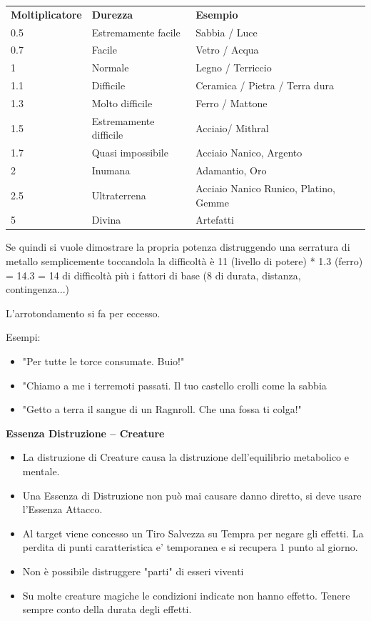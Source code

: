 \documentclass[a4paper,10 pt,twoside,openany]{book}
\begin{document}
\medskip
\begin{tabular}{lll}
	\toprule
	\textbf{Moltiplicatore} & \textbf{Durezza}       & \textbf{Esempio}\\
	0.5                   & Estremamente facile    & Sabbia / Luce \\
	0.7                   & Facile                 & Vetro / Acqua\\
	1                     & Normale                & Legno / Terriccio\\
	1.1                   & Difficile              & Ceramica / Pietra / Terra dura\\
	1.3                   & Molto difficile        & Ferro / Mattone\\
	1.5                   & Estremamente difficile & Acciaio/ Mithral\\
	1.7                   & Quasi impossibile      & Acciaio Nanico, Argento\\
	2                     & Inumana                & Adamantio, Oro\\
	2.5                   & Ultraterrena           & Acciaio Nanico Runico, Platino, Gemme\\
	5                     & Divina                 & Artefatti \\

\end{tabular}

\bigskip

Se quindi si vuole dimostrare la propria potenza distruggendo una serratura di metallo semplicemente toccandola la difficoltà è 11 (livello di potere) {*} 1.3 (ferro) = 14.3 = 14 di difficoltà più i fattori di base (8 di durata, distanza, contingenza...)

L'arrotondamento si fa per eccesso.

Esempi:
\begin{itemize}
	\item
	"Per tutte le torce consumate. Buio!"
	\item
	"Chiamo a me i terremoti passati. Il tuo castello crolli come la sabbia
	\item
	"Getto a terra il sangue di un Ragnroll. Che una fossa ti colga!"
\end{itemize}


\textbf{Essenza Distruzione -- Creature}
\begin{itemize}
	\item
	La distruzione di Creature causa la distruzione dell'equilibrio metabolico e mentale.
	\item
	Una Essenza di Distruzione non può mai causare danno diretto, si deve usare l'Essenza Attacco.
	\item
	Al target viene concesso un Tiro Salvezza su Tempra per negare gli effetti. La perdita di punti caratteristica e' temporanea e si recupera 1 punto al giorno.
	\item
	Non è possibile distruggere "parti" di esseri viventi
	\item
	Su molte creature magiche le condizioni indicate non hanno effetto. Tenere sempre conto della durata degli effetti.
\end{itemize}
\end{document}

